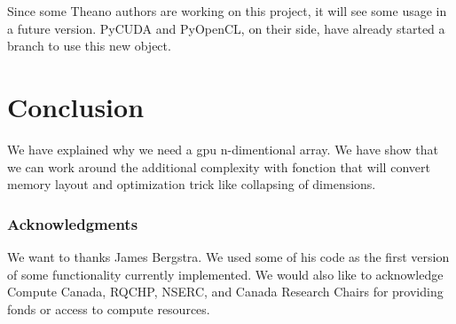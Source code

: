 \documentclass{article} %
\begin{document}
Since some Theano authors are working on this project, it will see some usage in a future version. PyCUDA and PyOpenCL, on their side, have already started a branch to use this new object.

\section{Conclusion}

We have explained why we need a gpu n-dimentional array. We have show that we can work around the additional complexity with fonction that will convert memory layout and optimization trick like collapsing of dimensions.

\subsubsection*{Acknowledgments}

We want to thanks James Bergstra. We used some of his code as the first version of some functionality currently implemented. We would also like to acknowledge Compute Canada, RQCHP, NSERC, and Canada Research Chairs for providing fonds or access to compute resources.




\end{document}
